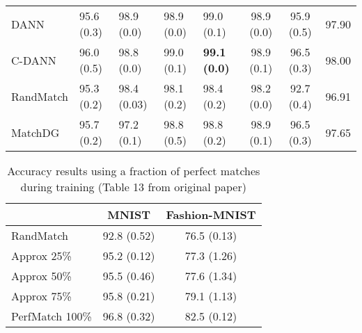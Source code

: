 \begin{table}[h!]
\begin{adjustbox}{width=\columnwidth,center}
\begin{tabular}{l|llllccc}
DANN      & 95.6 (0.3)            & 98.9 (0.0)             & 98.9 (0.0)             & 99.0 (0.1)             & 98.9 (0.0)             & 95.9 (0.5)             & 97.90                         \\
C-DANN    & 96.0 (0.5)            & 98.8 (0.0)             & 99.0 (0.1)             & \textbf{99.1 (0.0)}    & 98.9 (0.1)             & 96.5 (0.3)             & 98.00                         \\
RandMatch & 95.3 (0.2)            & 98.4 (0.03)            & 98.1 (0.2)             & 98.4 (0.2)             & 98.2 (0.0)             & 92.7 (0.4)             & 96.91                         \\
MatchDG   & 95.7 (0.2)            & 97.2 (0.1)             & 98.8 (0.5)             & 98.8 (0.2)             & 98.9 (0.1)             & 96.5 (0.3)             & 97.65                         \\ \hline
\end{tabular}
\end{adjustbox}
\end{table}




\begin{table}[h!]
\centering
\caption{\label{tab:table_13}Accuracy results using a fraction of perfect matches
during training (Table 13 from original paper)}
\begin{tabular}{l|cc}
\hline
                & MNIST       & Fashion-MNIST \\ \hline
RandMatch       & 92.8 (0.52) & 76.5 (0.13)   \\ \hline
Approx 25\%     & 95.2 (0.12) & 77.3 (1.26)   \\
Approx 50\%     & 95.5 (0.46) & 77.6 (1.34)   \\
Approx 75\%     & 95.8 (0.21) & 79.1 (1.13)   \\ \hline
PerfMatch 100\% & 96.8 (0.32) & 82.5 (0.12)   \\ \hline
\end{tabular}
\end{table}


